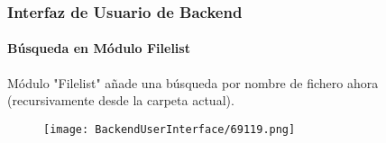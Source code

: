 \begin{frame}[fragile]
	\frametitle{Interfaz de Usuario de Backend}
	\framesubtitle{Búsqueda en Módulo Filelist}

	Módulo "Filelist" añade una búsqueda por nombre de fichero ahora (recursivamente desde la
	carpeta actual).

	\begin{figure}
		\texttt{[image: BackendUserInterface/69119.png]}
	\end{figure}

\end{frame}

